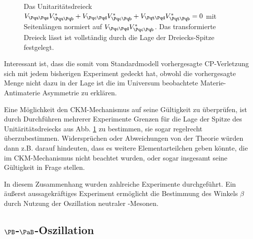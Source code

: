 \begin{figure}
  \centering
  \caption{Das Unitaritätsdreieck $\Vud\Vub^* + \Vcd\Vcb^* + \Vtd\Vtb^* = 0$ mit Seitenlängen normiert auf $\Vcd\Vcb^*$. Das transformierte Dreieck lässt ist vollständig durch die Lage der Dreiecks-Spitze festgelegt.}
  \label{unitarity-triangle}
\end{figure}

Interessant ist, dass die somit vom Standardmodell vorhergesagte CP-Verletzung sich mit jedem bisherigen Experiment gedeckt hat, obwohl die vorhergesagte Menge nicht dazu in der Lage ist die im Universum beobachtete Materie-Antimaterie Asymmetrie zu erklären.

Eine Möglichkeit den CKM-Mechanismus auf seine Gültigkeit zu überprüfen, ist durch Durchführen mehrerer Experimente Grenzen für die Lage der Spitze des Unitäritätsdreiecks aus Abb. \ref{unitarity-triangle} zu bestimmen, sie sogar regelrecht überzubestimmen.
Widersprüchen oder Abweichungen von der Theorie würden dann z.B. darauf hindeuten, dass es weitere Elementarteilchen geben könnte, die im CKM-Mechanismus nicht beachtet wurden, oder sogar insgesamt seine Gültigkeit in Frage stellen.

In diesem Zusammenhang wurden zahlreiche Experimente durchgeführt.
Ein äußerst aussagekräftiges Experiment ermöglicht die Bestimmung des Winkels $β$ durch Nutzung der Oszillation neutraler \PB-Mesonen.


\subsection{$\PB$-$\PaB$-Oszillation}

